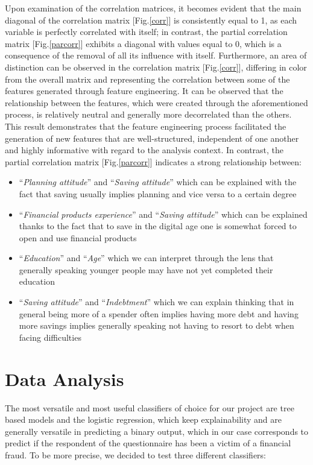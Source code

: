 \documentclass[a4paper,11pt]{article}
\begin{document}
Upon examination of the correlation matrices, it becomes evident that the main diagonal of the correlation matrix [Fig.\ref{corr}] is consistently equal to 1, as each variable is perfectly correlated with itself; in contrast, the partial correlation matrix [Fig.\ref{parcorr}] exhibits a diagonal with values equal to 0, which is a consequence of the removal of all its influence with itself. Furthermore, an area of distinction can be observed in the correlation matrix [Fig.\ref{corr}], differing in color from the overall matrix and representing the correlation between some of the features generated through feature engineering. It can be observed that the relationship between the features, which were created through the aforementioned process, is relatively neutral and generally more decorrelated than the others. This result demonstrates that the feature engineering process facilitated the generation of new features that are well-structured, independent of one another and highly informative with regard to the analysis context. In contrast, the partial correlation matrix [Fig.\ref{parcorr}] indicates a strong relationship between: 
\begin{itemize}
\item “\textit{Planning attitude}” and “\textit{Saving attitude}” which can be explained with the fact that saving usually implies planning and vice versa to a certain degree
\item “\textit{Financial products experience}” and “\textit{Saving attitude}” which can be explained thanks to the fact that to save in the digital age one is somewhat forced to open and use financial products
\item “\textit{Education}” and “\textit{Age}” which we can interpret through the lens that generally speaking younger people may have not yet completed their education
\item “\textit{Saving attitude}” and “\textit{Indebtment}” which we can explain thinking that in general being more of a spender often implies having more debt and having more savings implies generally speaking not having to resort to debt when facing difficulties 
\end{itemize}


\section{Data Analysis}

The most versatile and most useful classifiers of choice for our project are tree based models and the logistic regression, which keep explainability and are generally versatile in predicting a binary output, which in our case corresponds to predict if the respondent of the questionnaire has been a victim of a financial fraud. To be more precise, we decided to test three different classifiers:
\end{document}
